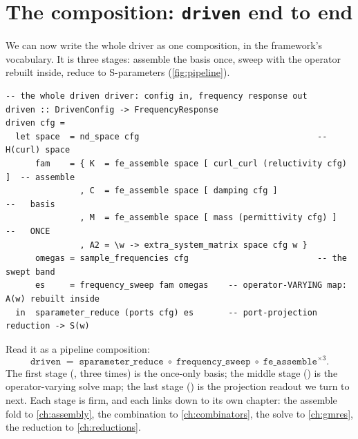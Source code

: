 \section{The composition: \texttt{driven} end to end}

We can now write the whole driver as one composition, in the framework's
vocabulary. It is three stages: assemble the basis once, sweep with the operator
rebuilt inside, reduce to S-parameters (\cref{fig:pipeline}).
\begin{lstlisting}[style=l4style]
-- the whole driven driver: config in, frequency response out
driven :: DrivenConfig -> FrequencyResponse
driven cfg =
  let space  = nd_space cfg                                    -- H(curl) space
      fam    = { K  = fe_assemble space [ curl_curl (reluctivity cfg) ]  -- assemble
               , C  = fe_assemble space [ damping cfg ]                  --   basis
               , M  = fe_assemble space [ mass (permittivity cfg) ]      --   ONCE
               , A2 = \w -> extra_system_matrix space cfg w }
      omegas = sample_frequencies cfg                          -- the swept band
      es     = frequency_sweep fam omegas    -- operator-VARYING map: A(w) rebuilt inside
  in  sparameter_reduce (ports cfg) es       -- port-projection reduction -> S(w)
\end{lstlisting}
Read it as a pipeline composition:
\[
  \texttt{driven}
    \;=\;
  \texttt{sparameter\_reduce}
    \;\circ\;
  \texttt{frequency\_sweep}
    \;\circ\;
  \texttt{fe\_assemble}^{\times 3}.
\]
The first stage (, three times) is the once-only basis; the
middle stage () is the operator-varying solve map; the last
stage () is the projection readout we turn to next. Each
stage is firm, and each links down to its own chapter: the assemble fold to
\cref{ch:assembly}, the combination to \cref{ch:combinators}, the solve to
\cref{ch:gmres}, the reduction to \cref{ch:reductions}.

